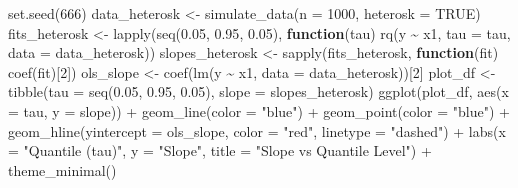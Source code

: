 \documentclass[fleqn,8pt]{latex/stylish_article} %
\newenvironment{Shaded}{\begin{snugshade}}{\end{snugshade}}
\newcommand{\DecValTok}[1]{\textcolor[rgb]{0.00,0.00,0.81}{{#1}}}
\newcommand{\FloatTok}[1]{\textcolor[rgb]{0.00,0.00,0.81}{{#1}}}
\newcommand{\ConstantTok}[1]{\textcolor[rgb]{0.00,0.00,0.00}{{#1}}}
\newcommand{\SpecialCharTok}[1]{\textcolor[rgb]{0.00,0.00,0.00}{{#1}}}
\newcommand{\StringTok}[1]{\textcolor[rgb]{0.31,0.60,0.02}{{#1}}}
\newcommand{\OtherTok}[1]{\textcolor[rgb]{0.56,0.35,0.01}{{#1}}}
\newcommand{\FunctionTok}[1]{\textcolor[rgb]{0.00,0.00,0.00}{{#1}}}
\newcommand{\ControlFlowTok}[1]{\textcolor[rgb]{0.13,0.29,0.53}{\textbf{{#1}}}}
\newcommand{\AttributeTok}[1]{\textcolor[rgb]{0.77,0.63,0.00}{{#1}}}
\newcommand{\NormalTok}[1]{{#1}}
\begin{document}
\begin{Shaded}
\begin{Highlighting}[]
\FunctionTok{set.seed}\NormalTok{(}\DecValTok{666}\NormalTok{)}
\NormalTok{data\_heterosk }\OtherTok{\textless{}{-}} \FunctionTok{simulate\_data}\NormalTok{(}\AttributeTok{n =} \DecValTok{1000}\NormalTok{, }\AttributeTok{heterosk =} \ConstantTok{TRUE}\NormalTok{)}
\NormalTok{fits\_heterosk }\OtherTok{\textless{}{-}} \FunctionTok{lapply}\NormalTok{(}\FunctionTok{seq}\NormalTok{(}\FloatTok{0.05}\NormalTok{, }\FloatTok{0.95}\NormalTok{, }\FloatTok{0.05}\NormalTok{), }\ControlFlowTok{function}\NormalTok{(tau) }\FunctionTok{rq}\NormalTok{(y }\SpecialCharTok{\textasciitilde{}}
\NormalTok{    x1, }\AttributeTok{tau =}\NormalTok{ tau, }\AttributeTok{data =}\NormalTok{ data\_heterosk))}
\NormalTok{slopes\_heterosk }\OtherTok{\textless{}{-}} \FunctionTok{sapply}\NormalTok{(fits\_heterosk, }\ControlFlowTok{function}\NormalTok{(fit) }\FunctionTok{coef}\NormalTok{(fit)[}\DecValTok{2}\NormalTok{])}
\NormalTok{ols\_slope }\OtherTok{\textless{}{-}} \FunctionTok{coef}\NormalTok{(}\FunctionTok{lm}\NormalTok{(y }\SpecialCharTok{\textasciitilde{}}\NormalTok{ x1, }\AttributeTok{data =}\NormalTok{ data\_heterosk))[}\DecValTok{2}\NormalTok{]}
\NormalTok{plot\_df }\OtherTok{\textless{}{-}} \FunctionTok{tibble}\NormalTok{(}\AttributeTok{tau =} \FunctionTok{seq}\NormalTok{(}\FloatTok{0.05}\NormalTok{, }\FloatTok{0.95}\NormalTok{, }\FloatTok{0.05}\NormalTok{), }\AttributeTok{slope =}\NormalTok{ slopes\_heterosk)}
\FunctionTok{ggplot}\NormalTok{(plot\_df, }\FunctionTok{aes}\NormalTok{(}\AttributeTok{x =}\NormalTok{ tau, }\AttributeTok{y =}\NormalTok{ slope)) }\SpecialCharTok{+} \FunctionTok{geom\_line}\NormalTok{(}\AttributeTok{color =} \StringTok{"blue"}\NormalTok{) }\SpecialCharTok{+}
    \FunctionTok{geom\_point}\NormalTok{(}\AttributeTok{color =} \StringTok{"blue"}\NormalTok{) }\SpecialCharTok{+} \FunctionTok{geom\_hline}\NormalTok{(}\AttributeTok{yintercept =}\NormalTok{ ols\_slope,}
    \AttributeTok{color =} \StringTok{"red"}\NormalTok{, }\AttributeTok{linetype =} \StringTok{"dashed"}\NormalTok{) }\SpecialCharTok{+} \FunctionTok{labs}\NormalTok{(}\AttributeTok{x =} \StringTok{"Quantile (tau)"}\NormalTok{,}
    \AttributeTok{y =} \StringTok{"Slope"}\NormalTok{, }\AttributeTok{title =} \StringTok{"Slope vs Quantile Level"}\NormalTok{) }\SpecialCharTok{+}
    \FunctionTok{theme\_minimal}\NormalTok{()}
\end{Highlighting}
\end{Shaded}
\end{document}

